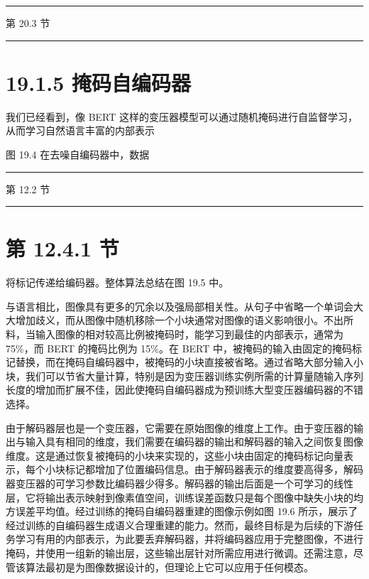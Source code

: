 \documentclass[10pt]{report}
\newcommand{\HRule}{\begin{center}\rule{0.9\linewidth}{0.2mm}\end{center}}
\begin{document}
\HRule

第 20.3 节

\HRule

\section*{19.1.5 掩码自编码器}

我们已经看到，像 BERT 这样的变压器模型可以通过随机掩码进行自监督学习，从而学习自然语言丰富的内部表示

图 19.4 在去噪自编码器中，数据

\HRule

第 12.2 节

\HRule

\section*{第 12.4.1 节}

将标记传递给编码器。整体算法总结在图 19.5 中。

与语言相比，图像具有更多的冗余以及强局部相关性。从句子中省略一个单词会大大增加歧义，而从图像中随机移除一个小块通常对图像的语义影响很小。不出所料，当输入图像的相对较高比例被掩码时，能学习到最佳的内部表示，通常为 75\%，而 BERT 的掩码比例为 15\%。在 BERT 中，被掩码的输入由固定的掩码标记替换，而在掩码自编码器中，被掩码的小块直接被省略。通过省略大部分输入小块，我们可以节省大量计算，特别是因为变压器训练实例所需的计算量随输入序列长度的增加而扩展不佳，因此使掩码自编码器成为预训练大型变压器编码器的不错选择。

由于解码器层也是一个变压器，它需要在原始图像的维度上工作。由于变压器的输出与输入具有相同的维度，我们需要在编码器的输出和解码器的输入之间恢复图像维度。这是通过恢复被掩码的小块来实现的，这些小块由固定的掩码标记向量表示，每个小块标记都增加了位置编码信息。由于解码器表示的维度要高得多，解码器变压器的可学习参数比编码器少得多。解码器的输出后面是一个可学习的线性层，它将输出表示映射到像素值空间，训练误差函数只是每个图像中缺失小块的均方误差平均值。经过训练的掩码自编码器重建的图像示例如图 19.6 所示，展示了经过训练的自编码器生成语义合理重建的能力。然而，最终目标是为后续的下游任务学习有用的内部表示，为此要丢弃解码器，并将编码器应用于完整图像，不进行掩码，并使用一组新的输出层，这些输出层针对所需应用进行微调。还需注意，尽管该算法最初是为图像数据设计的，但理论上它可以应用于任何模态。
\end{document}
